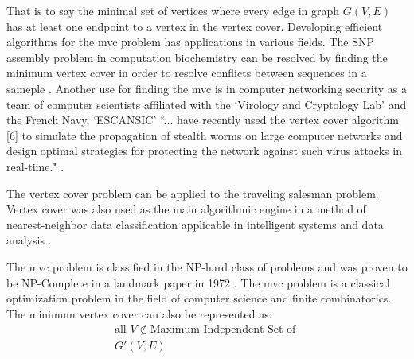\documentclass[conference,letterpaper]{IEEEtran}
\begin{document}
\par That is to say the minimal set of vertices where every edge in graph $G(V,E)$ has at least one endpoint to a vertex in the vertex cover. Developing efficient algorithms for the mvc problem has applications in various fields. The SNP assembly problem in computation biochemistry can be resolved by finding the minimum vertex cover in order to resolve conflicts between sequences in a sameple \cite{pirzada}. Another use for finding the mvc is in computer networking security as a team of computer scientists affiliated with the `Virology and Cryptology Lab' and the French Navy, `ESCANSIC' ``... have recently used the vertex cover algorithm [6] to simulate the propagation of stealth worms on large computer networks and design optimal strategies for protecting the network against such virus attacks in real-time." \cite{pirzada}. 
\par The vertex cover problem can be applied to the traveling salesman problem. Vertex cover was also used as the main algorithmic engine in a method of nearest-neighbor data classification applicable in intelligent systems and data analysis \cite{gkk}.

\par The mvc problem is classified in the NP-hard class of problems and was proven to be NP-Complete in a landmark paper in 1972 \cite{kar72}. The mvc problem is a classical optimization problem in the field of computer science and finite combinatorics. The minimum vertex cover can also be represented as:
\begin{equation}
    \begin{split}
        \mbox{all } V \notin \mbox{Maximum Independent Set of } \\ 
        G'(V, E)
    \end{split}
\end{equation}
\end{document}
